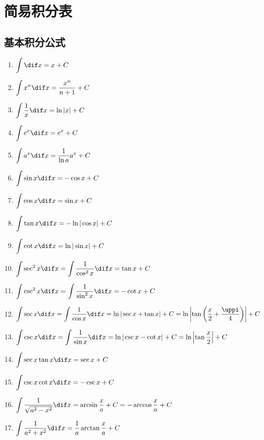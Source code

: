 \chapter{简易积分表}
\section*{基本积分公式}
\begin{enumerate}[1.,itemsep=5pt]
  \item $\displaystyle \int \dif x=x+C$
  \item $\displaystyle \int x^n\dif x=\frac{x^n}{n+1}+C$
  \item $\displaystyle \int \frac{1}{x}\dif x=\ln|x|+C$
  \item $\displaystyle \int e^x\dif x=e^x+C$
  \item $\displaystyle \int a^x\dif x=\frac{1}{\ln a}a^x+C$
  \item $\displaystyle \int \sin x\dif x=-\cos x+C$
  \item $\displaystyle \int \cos x\dif x=\sin x+C$
  \item $\displaystyle \int \tan x\dif x=-\ln|\cos x|+C$
  \item $\displaystyle \int \cot x\dif x=\ln|\sin x|+C$
  \item $\displaystyle \int \sec^2 x\dif x=\int \frac{1}{\cos^2 x} \dif x=\tan x+C$
  \item $\displaystyle \int \csc^2 x\dif x=\int \frac{1}{\sin^2 x} \dif x=-\cot x+C$
  \item $\displaystyle \int \sec x\dif x=\int \frac{1}{\cos x} \dif x=\ln|\sec x+\tan x|+C =\ln\left|\tan\left(\frac{x}{2}+\frac{\uppi}{4}\right)\right| +C$
  \item $\displaystyle \int \csc x\dif x=\int \frac{1}{\sin x} \dif x=\ln|\csc x-\cot x|+C =\ln\left|\tan\frac{x}{2}\right|+C$
  \item $\displaystyle \int \sec x\tan x\dif x=\sec x+C$
  \item $\displaystyle \int \csc x\cot x\dif x=-\csc x+C$
  \item $\displaystyle \int \frac{1}{\sqrt{a^2-x^2}}\dif x=\arcsin \frac{x}{a}+C = -\arccos\frac{x}{a} +C$
  \item $\displaystyle \int \frac{1}{a^2+x^2}\dif x=\frac{1}{a}\arctan \frac{x}{a}+C$
\end{enumerate}
